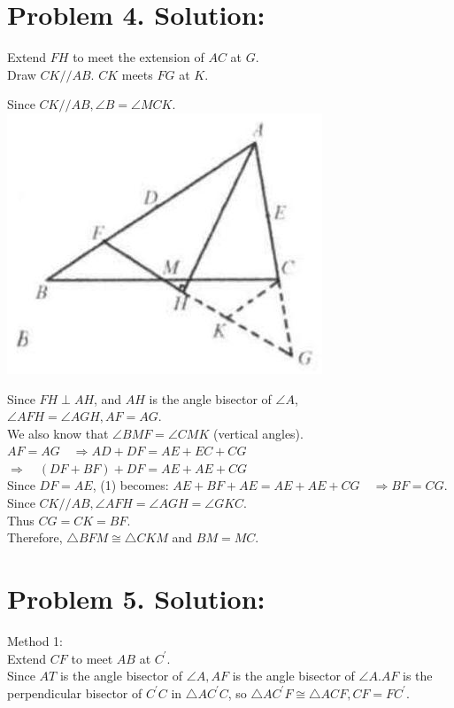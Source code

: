 \documentclass[10pt]{article}
\begin{document}
\section*{Problem 4. Solution:}
Extend \(F H\) to meet the extension of \(A C\) at \(G\).\\
Draw \(C K / / A B\). \(C K\) meets \(F G\) at \(K\).

Since \(C K / / A B, \angle B=\angle M C K\).\\
\includegraphics[max width=\textwidth, center]{2025_04_17_97bc1f7e44d93c271a88g-068}

Since \(F H \perp A H\), and \(A H\) is the angle bisector of \(\angle A\),\\
\(\angle A F H=\angle A G H, A F=A G\).\\
We also know that \(\angle B M F=\angle C M K\) (vertical angles).\\
\(A F=A G \quad \Rightarrow A D+D F=A E+E C+C G\)\\
\(\Rightarrow \quad(D F+B F)+D F=A E+A E+C G\)\\
Since \(D F=A E\), (1) becomes: \(A E+B F+A E=A E+A E+C G \quad \Rightarrow B F=C G\).\\
Since \(C K / / A B, \angle A F H=\angle A G H=\angle G K C\).\\
Thus \(C G=C K=B F\).\\
Therefore, \(\triangle B F M \cong \triangle C K M\) and \(B M=M C\).

\section*{Problem 5. Solution:}
Method 1:\\
Extend \(C F\) to meet \(A B\) at \(C^{\prime}\).\\
Since \(A T\) is the angle bisector of \(\angle A, A F\) is the angle bisector of \(\angle A . A F\) is the perpendicular bisector of \(C^{\prime} C\) in \(\triangle A C^{\prime} C\), so \(\triangle A C^{\prime} F \cong \triangle A C F, C F=F C^{\prime}\).
\end{document}
